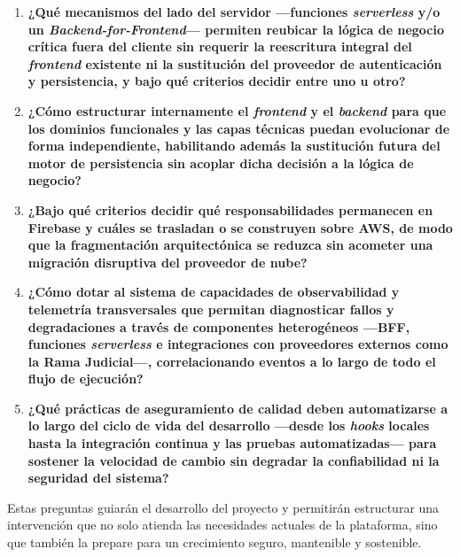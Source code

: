 \begin{enumerate}
  \item \textbf{¿Qué mecanismos del lado del servidor —funciones \textit{serverless} y/o un \textit{Backend-for-Frontend}— permiten reubicar la lógica de negocio crítica fuera del cliente sin requerir la reescritura integral del \textit{frontend} existente ni la sustitución del proveedor de autenticación y persistencia, y bajo qué criterios decidir entre uno u otro?}

  \item \textbf{¿Cómo estructurar internamente el \textit{frontend} y el \textit{backend} para que los dominios funcionales y las capas técnicas puedan evolucionar de forma independiente, habilitando además la sustitución futura del motor de persistencia sin acoplar dicha decisión a la lógica de negocio?}

  \item \textbf{¿Bajo qué criterios decidir qué responsabilidades permanecen en Firebase y cuáles se trasladan o se construyen sobre AWS, de modo que la fragmentación arquitectónica se reduzca sin acometer una migración disruptiva del proveedor de nube?}

  \item \textbf{¿Cómo dotar al sistema de capacidades de observabilidad y telemetría transversales que permitan diagnosticar fallos y degradaciones a través de componentes heterogéneos —BFF, funciones \textit{serverless} e integraciones con proveedores externos como la Rama Judicial—, correlacionando eventos a lo largo de todo el flujo de ejecución?}

  \item \textbf{¿Qué prácticas de aseguramiento de calidad deben automatizarse a lo largo del ciclo de vida del desarrollo —desde los \textit{hooks} locales hasta la integración continua y las pruebas automatizadas— para sostener la velocidad de cambio sin degradar la confiabilidad ni la seguridad del sistema?}
\end{enumerate}

Estas preguntas guiarán el desarrollo del proyecto y permitirán estructurar una intervención que no solo atienda las necesidades actuales de la plataforma, sino que también la prepare para un crecimiento seguro, mantenible y sostenible.

